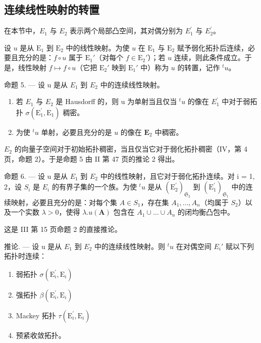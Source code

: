 \subsection{连续线性映射的转置}

在本节中，\(E_{1}\) 与 \(E_{2}\) 表示两个局部凸空间，其对偶分别为 \(E_{1}^{\prime}\) 与 \(E_{2}^{\prime}\)。

设 \(u\) 是从 \(\mathrm{E}_1\) 到 \(\mathrm{E}_2\) 中的线性映射。为使 \(u\) 在 \(\mathrm{E}_1\) 与 \(\mathrm{E}_2\) 赋予弱化拓扑后连续，必要且充分的是：\(f \circ u\) 属于 \(\mathrm{E}_1'\)（对每个 \(f \in \mathrm{E}_2'\)）；若 \(u\) 连续，则此条件成立。于是，线性映射 \(f \mapsto f \circ u\)（它把 \(\mathrm{E}_2'\) 映到 \(\mathrm{E}_1'\) 中）称为 \(u\) 的转置，记作 \(^t u\)。

命题 5. --- 设 u 是从 \(E_{1}\) 到 \(E_{2}\) 中的连续线性映射。

\begin{enumerate}
\def\labelenumi{(\roman{enumi})}
\item
  若 \(E_{1}\) 与 \(E_{2}\) 是 Hausdorff 的，则 u 为单射当且仅当 \(^{t}u\) 的像在 \(E_{1}^{\prime}\) 中对于弱拓扑 \(\sigma(\mathrm{E}_{1}^{\prime},\mathrm{E}_{1})\) 稠密。
\item
  为使 \({}^{t}u\) 单射，必要且充分的是 \(u\) 的像在 \(\mathbf{E}_2\) 中稠密。
\end{enumerate}

\(E_{2}\) 的向量子空间对于初始拓扑稠密，当且仅当它对于弱化拓扑稠密（IV，第 4 页，命题 2）。于是命题 5 由 II 第 47 页的推论 2 得出。

命题 6. --- 设 u 是从 \(E_{1}\) 到 \(E_{2}\) 中的线性映射，且它对于弱化拓扑连续。对 i = 1, 2，设 \(S_{i}\) 是 \(E_{i}\) 的有界子集的一个族。为使 \(^{t}u\) 是从 \((\mathrm{E}_{2}^{\prime})_{\mathfrak{S}_{2}}\) 到 \((\mathrm{E}_{1}^{\prime})_{\mathfrak{S}_{1}}\) 中的连续映射，必要且充分的是：对每个集 \(A \in S_{1}\)，存在集 \(A_{1}, \ldots, A_{n}\)（均属于 \(S_{2}\)）以及一个实数 \(\lambda > 0\)，使得 \(\lambda.u(\mathbf{A})\) 包含在 \(A_{1} \cup \ldots \cup A_{n}\) 的闭均衡凸包中。

这是 III 第 15 页命题 2 的直接推论。

推论. --- 设 u 是从 \(E_{1}\) 到 \(E_{2}\) 中的连续线性映射。则 \({}^t u\) 在对偶空间 \(E_{i}'\) 赋以下列拓扑时连续：

\begin{enumerate}
\def\labelenumi{\alph{enumi})}
\item
  弱拓扑 \(\sigma (\mathrm{E}_i^{\prime},\mathrm{E}_i)\)
\item
  强拓扑 \(\beta (\mathrm{E}_i^{\prime},\mathrm{E}_i)\)
\item
  Mackey 拓扑 \(\tau (\mathrm{E}_i^{\prime},\mathrm{E}_i)\)
\item
  预紧收敛拓扑。
\end{enumerate}

